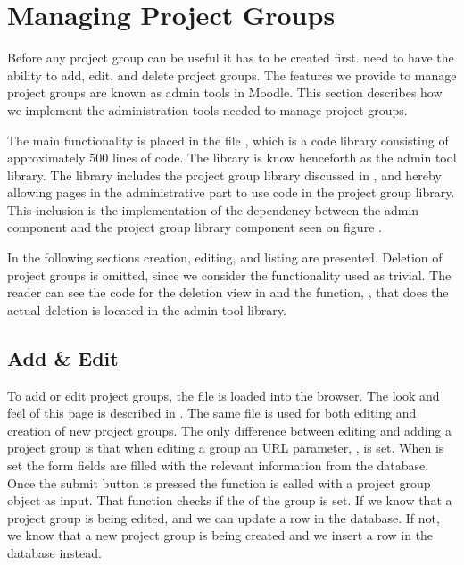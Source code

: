 \section{Managing Project Groups} %
\label{sec:manProjGrpImpl}
Before any project group can be useful it has to be created first.
\admpers{} need to have the ability to add, edit, and delete project groups.
The features we provide to manage project groups are known as admin tools in Moodle.
This section describes how we implement the administration tools needed to manage project groups.


The main functionality is placed in the file , which is a code library consisting of approximately $500$ lines of code. 
The library is know henceforth as the admin tool library.
The library includes the project group library discussed in , and hereby allowing pages in the administrative part to use code in the project group library. 
This inclusion is the implementation of the dependency between the admin component and the project group library component seen on figure . 

In the following sections creation, editing, and listing are presented. 
Deletion of project groups is omitted, since we consider the functionality used as trivial. 
The reader can see the code for the deletion view in  and the function, , that does the actual deletion is located in the admin tool library.

\subsection{Add \& Edit}
To add or edit project groups, the file  is loaded into the browser. 
The look and feel of this page is described in .
The same file is used for both editing and creation of new project groups. 
The only difference between editing and adding a project group is that when editing a group an URL parameter, , is set.
When  is set the form fields are filled with the relevant information from the database.
Once the submit button is pressed the function  is called with a project group object as input.
That function checks if the  of the group is set. 
If we know that a project group is being edited, and we can update a row in the database.
If not, we know that a new project group is being created and we insert a row in the database instead.

